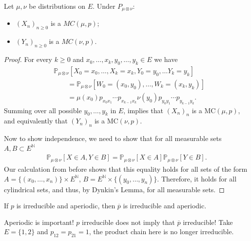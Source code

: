 \begin{prop}[]
	Let $\mu,\nu $ be distributions on $E$. Under $P_{\mu \otimes \nu }:$ 
\begin{itemize}
	\item $(X_n)_{n\geq 0}$ is a $MC(\mu ,p)$;
	\item $(Y_n)_{n\geq 0}$ is a $MC(\nu ,p)$.
\end{itemize}
\end{prop}
\begin{proof}
	For every $k\geq 0$ and $x_0,\ldots,x_k, y_0, \ldots, y_k \in E$ we have
\begin{align}
&	\mathbb{P}_{\mu \otimes \nu } \left[ X_0 = x_0, \ldots, X_k=x_k, Y_0 = y_0, \ldots Y_k = y_k \right] \\
&\qquad= \mathbb{P}_{\mu \otimes \nu } \left[ W_0=(x_0, y_0), \ldots, W_k = (x_k, y_k) \right] \\
&\qquad= \mu (x_0) p_{x_0x_1}\cdots p_{x_{k-1}x_k} \nu (y_0) p_{y_0 y_1} \cdots p_{y_{k-1}y_k}
.	\end{align}
Summing over all possible $y_0,\ldots , y_k$ in $E$, implies that $(X_n)_{n}$ is a MC$(\mu ,p)$, and equivalently that $(Y_n)_{n}$ is a MC$(\nu ,p)$.	

Now to show independence, we need to show that for all measurable sets $A,B \subset E^{\mathbb{N}}$ 
\begin{align}
	\mathbb{P}_{\mu \otimes \nu } \left[ X \in A, Y\in B \right] = \mathbb{P}_{\mu \otimes \nu } \left[ X \in A \right] \mathbb{P}_{\mu \otimes \nu } \left[ Y \in B \right].
\end{align}
Our calculation from before shows that this equality holds for all sets of the form $A = \{(x_0,\ldots,x_n)\} \times E^{\mathbb{N}}$, $B=E^{\mathbb{N}}\times \{(y_0,\ldots , y_n)\}$. Therefore, it holds for all cylindrical sets, and thus, by Dynkin's Lemma, for all measurable sets.
\end{proof}


\begin{prop}[]
	If $p$ is irreducible and aperiodic, then $\overline{p}$ is irreducible and aperiodic.
\end{prop}

\begin{rmk}[]
	Aperiodic is important!  $p$ irreducible does not imply that $\overline{p}$ irreducible! Take $E = \{1,2\}$ and $p_{12} = p_{21}=1$, the product chain here is no longer irreducible.
\end{rmk}

